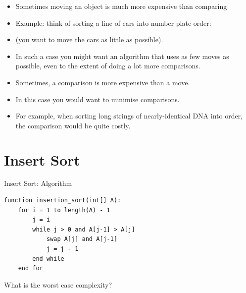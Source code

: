 \documentclass{beamer}
\begin{document}
\begin{frame}
\begin{itemize}
\item Sometimes moving an object is much more expensive than comparing
\item Example: think of sorting a line of cars into number plate order: 
\item (you want to move the cars as little as possible).
\item In such a case you might want an algorithm that uses as few moves as possible, even to the extent of doing a lot
more comparisons.
\item Sometimes, a comparison is more expensive than a move. 
\item In this case you would want to minimise comparisons.
\item For example, when sorting long strings of nearly-identical DNA into order, the comparison would be quite costly.
\end{itemize}
\end{frame} 

\section{Insert Sort}
\begin{frame}[fragile]

Insert Sort: Algorithm

\begin{block}{}
\begin{lstlisting}
function insertion_sort(int[] A): 
    for i = 1 to length(A) - 1
        j = i
        while j > 0 and A[j-1] > A[j]
            swap A[j] and A[j-1]
            j = j - 1
        end while
    end for

\end{lstlisting}
\end{block}

What is the worst case complexity?
\end{frame} 
\end{document}
